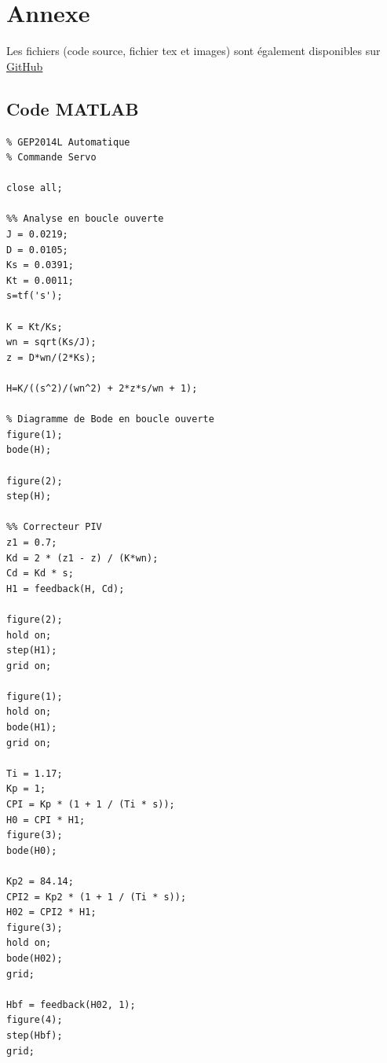 \documentclass{article}
\begin{document}
\clearpage
\section{Annexe}
Les fichiers (code source, fichier tex et images) sont également disponibles sur \href{https://github.com/AL3X-69/GEP2014L/blob/master/tp3.m}{GitHub}
\subsection{Code MATLAB}
\begin{lstlisting}
% GEP2014L Automatique
% Commande Servo

close all;

%% Analyse en boucle ouverte
J = 0.0219;
D = 0.0105;
Ks = 0.0391;
Kt = 0.0011;
s=tf('s');

K = Kt/Ks;
wn = sqrt(Ks/J);
z = D*wn/(2*Ks);

H=K/((s^2)/(wn^2) + 2*z*s/wn + 1);

% Diagramme de Bode en boucle ouverte
figure(1);
bode(H);

figure(2);
step(H);

%% Correcteur PIV
z1 = 0.7;
Kd = 2 * (z1 - z) / (K*wn);
Cd = Kd * s;
H1 = feedback(H, Cd);

figure(2);
hold on;
step(H1);
grid on;

figure(1);
hold on;
bode(H1);
grid on;

Ti = 1.17;
Kp = 1;
CPI = Kp * (1 + 1 / (Ti * s));
H0 = CPI * H1;
figure(3);
bode(H0);

Kp2 = 84.14;
CPI2 = Kp2 * (1 + 1 / (Ti * s));
H02 = CPI2 * H1;
figure(3);
hold on;
bode(H02);
grid;

Hbf = feedback(H02, 1);
figure(4);
step(Hbf);
grid;
\end{lstlisting}
\end{document}

